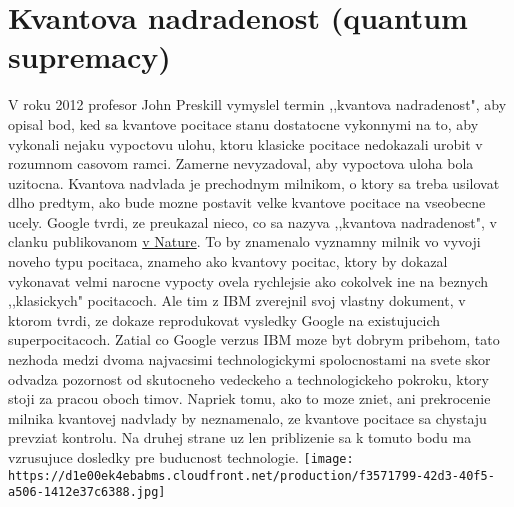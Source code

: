 \documentclass{article}
\begin{document}
\section{Kvantova nadradenost (quantum supremacy)}
V roku 2012 profesor John Preskill vymyslel termin ,,kvantova nadradenost", aby opisal bod, ked sa kvantove pocitace stanu dostatocne vykonnymi na to, aby vykonali nejaku vypoctovu ulohu, ktoru klasicke pocitace nedokazali urobit v rozumnom casovom ramci. Zamerne nevyzadoval, aby vypoctova uloha bola uzitocna. Kvantova nadvlada je prechodnym milnikom, o ktory sa treba usilovat dlho predtym, ako bude mozne postavit velke kvantove pocitace na vseobecne ucely.
\bigbreak
Google tvrdi, ze preukazal nieco, co sa nazyva ,,kvantova nadradenost", v clanku publikovanom \href{https://www.nature.com/articles/s41586-019-1666-5}{v Nature}. To by znamenalo vyznamny milnik vo vyvoji noveho typu pocitaca, znameho ako kvantovy pocitac, ktory by dokazal vykonavat velmi narocne vypocty ovela rychlejsie ako cokolvek ine na beznych ,,klasickych" pocitacoch. Ale tim z IBM zverejnil svoj vlastny dokument, v ktorom tvrdi, ze dokaze reprodukovat vysledky Google na existujucich superpocitacoch.
\bigbreak
Zatial co Google verzus IBM moze byt dobrym pribehom, tato nezhoda medzi dvoma najvacsimi technologickymi spolocnostami na svete skor odvadza pozornost od skutocneho vedeckeho a technologickeho pokroku, ktory stoji za pracou oboch timov. Napriek tomu, ako to moze zniet, ani prekrocenie milnika kvantovej nadvlady by neznamenalo, ze kvantove pocitace sa chystaju prevziat kontrolu. Na druhej strane uz len priblizenie sa k tomuto bodu ma vzrusujuce dosledky pre buducnost technologie.
\bigbreak
\bigbreak
\texttt{[image: https://d1e00ek4ebabms.cloudfront.net/production/f3571799-42d3-40f5-a506-1412e37c6388.jpg]}
\bigbreak
\end{document}
